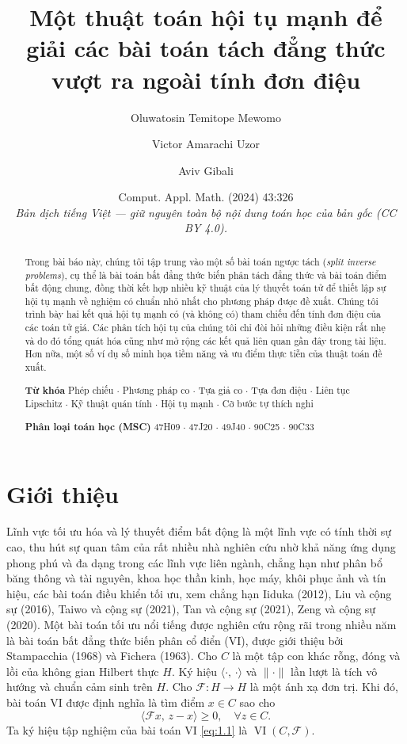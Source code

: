 \documentclass{MyBook}
\title{\vspace{-1.2cm}\bfseries Một thuật toán hội tụ mạnh để giải các bài toán tách đẳng thức vượt ra ngoài tính đơn điệu}
\author{Oluwatosin Temitope Mewomo \and Victor Amarachi Uzor \and Aviv Gibali}
\date{\small Comput. Appl. Math. (2024) 43:326\\[2pt]
\textit{Bản dịch tiếng Việt --- giữ nguyên toàn bộ nội dung toán học của bản gốc (CC BY 4.0).}}
\theoremstyle{plain}
\theoremstyle{definition}
\theoremstyle{remark}
\numberwithin{equation}{chapter}
\newcommand{\Fc}{\mathcal{F}}
\newcommand{\inp}[2]{\langle #1,\,#2\rangle}
\newcommand{\nm}[1]{\lVert #1\rVert}
\DeclareMathOperator{\VI}{VI}
\begin{document}
\frontmatter
\maketitle

\begin{abstract}
\noindent Trong bài báo này, chúng tôi tập trung vào một số bài toán ngược tách (\textit{split inverse problems}), cụ thể là bài toán bất đẳng thức biến phân tách đẳng thức và bài toán điểm bất động chung, đồng thời kết hợp nhiều kỹ thuật của lý thuyết toán tử để thiết lập sự hội tụ mạnh về nghiệm có chuẩn nhỏ nhất cho phương pháp được đề xuất. Chúng tôi trình bày hai kết quả hội tụ mạnh có (và không có) tham chiếu đến tính đơn điệu của các toán tử giá. Các phân tích hội tụ của chúng tôi chỉ đòi hỏi những điều kiện rất nhẹ và do đó tổng quát hóa cũng như mở rộng các kết quả liên quan gần đây trong tài liệu. Hơn nữa, một số ví dụ số minh họa tiềm năng và ưu điểm thực tiễn của thuật toán đề xuất.

\medskip
\noindent\textbf{Từ khóa} Phép chiếu $\cdot$ Phương pháp co $\cdot$ Tựa giả co $\cdot$ Tựa đơn điệu $\cdot$ Liên tục Lipschitz $\cdot$ Kỹ thuật quán tính $\cdot$ Hội tụ mạnh $\cdot$ Cỡ bước tự thích nghi

\medskip
\noindent\textbf{Phân loại toán học (MSC)} 47H09 $\cdot$ 47J20 $\cdot$ 49J40 $\cdot$ 90C25 $\cdot$ 90C33
\end{abstract}
\tableofcontents
\mainmatter

\chapter{Giới thiệu}

Lĩnh vực tối ưu hóa và lý thuyết điểm bất động là một lĩnh vực có tính thời sự cao, thu hút sự quan tâm của rất nhiều nhà nghiên cứu nhờ khả năng ứng dụng phong phú và đa dạng trong các lĩnh vực liên ngành, chẳng hạn như phân bổ băng thông và tài nguyên, khoa học thần kinh, học máy, khôi phục ảnh và tín hiệu, các bài toán điều khiển tối ưu, xem chẳng hạn Iiduka (2012), Liu và cộng sự (2016), Taiwo và cộng sự (2021), Tan và cộng sự (2021), Zeng và cộng sự (2020). Một bài toán tối ưu nổi tiếng được nghiên cứu rộng rãi trong nhiều năm là bài toán bất đẳng thức biến phân cổ điển (VI), được giới thiệu bởi Stampacchia (1968) và Fichera (1963). Cho $C$ là một tập con khác rỗng, đóng và lồi của không gian Hilbert thực $H$. Ký hiệu $\inp{\cdot}{\cdot}$ và $\nm{\cdot}$ lần lượt là tích vô hướng và chuẩn cảm sinh trên $H$. Cho $\Fc:H\to H$ là một ánh xạ đơn trị. Khi đó, bài toán VI được định nghĩa là tìm điểm $x\in C$ sao cho
\begin{equation}
\inp{\Fc x}{z-x}\ge 0,\quad \forall z\in C. \label{eq:1.1}
\end{equation}
Ta ký hiệu tập nghiệm của bài toán VI \eqref{eq:1.1} là $\VI(C,\Fc)$.
\end{document}
